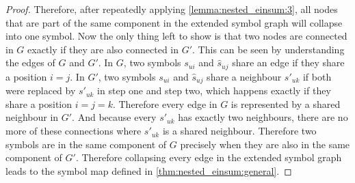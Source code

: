 \begin{proof}
    Therefore, after repeatedly applying \cref{lemma:nested_einsum:3},
    all nodes that are part of the same component in the extended symbol graph will collapse into one symbol.
    Now the only thing left to show is that two nodes are connected in $G$ exactly if they are also connected in $G'$.
    This can be seen by understanding the edges of $G$ and $G'$.
    In $G$, two symbols $s_{ui}$ and $\hat{s}_{uj}$ share an edge if they share a position $i = j$.
    In $G'$, two symbols $s_{ui}$ and $\hat{s}_{uj}$ share a neighbour $s'_{uk}$ if both were replaced by $s'_{uk}$ in step one and step two,
    which happens exactly if they share a position $i = j = k$.
    Therefore every edge in $G$ is represented by a shared neighbour in $G'$.
    And because every $s'_{uk}$ has exactly two neighbours, there are no more of these connections where $s'_{uk}$ is a shared neighbour.
    Therefore two symbols are in the same component of $G$ precisely when they are also in the same component of $G'$.
    Therefore collapsing every edge in the extended symbol graph leads to the symbol map defined in \cref{thm:nested_einsum:general}.
\end{proof}